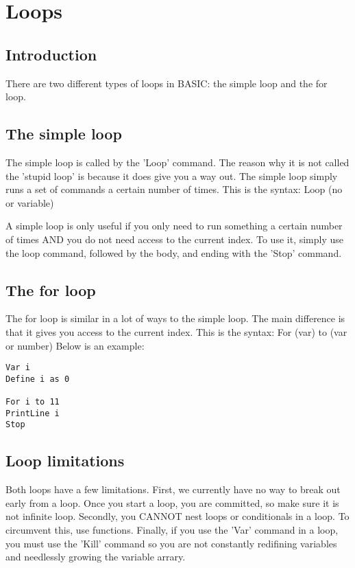 \documentclass{report}
\begin{document}
\chapter{Loops}

\section{Introduction}

There are two different types of loops in BASIC: the simple loop and the for loop.

\section{The simple loop}

The simple loop is called by the 'Loop' command. The reason why it is not called the 'stupid loop' is because it does give you a way out. The simple loop simply runs a set of commands a certain number of times. This is the syntax: Loop (no or variable)

A simple loop is only useful if you only need to run something a certain number of times AND you do not need access to the current index. To use it, simply use the loop command, followed by the body, and ending with the 'Stop' command.

\section{The for loop}

The for loop is similar in a lot of ways to the simple loop. The main difference is that it gives you access to the current index. This is the syntax: For (var) to (var or number)
Below is an example:

\begin{lstlisting}
Var i
Define i as 0

For i to 11
PrintLine i
Stop
\end{lstlisting}

\section{Loop limitations}

Both loops have a few limitations. First, we currently have no way to break out early from a loop. Once you start a loop, you are committed, so make sure it is not infinite loop. Secondly, you CANNOT nest loops or conditionals in a loop. To circumvent this, use functions. Finally, if you use the 'Var' command in a loop, you must use the 'Kill' command so you are not constantly redifining variables and needlessly growing the variable arrary.
\end{document}
